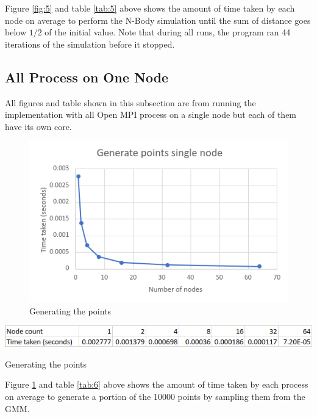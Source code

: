 \documentclass{article}
\begin{document}
Figure \ref{fig:5} and table \ref{tab:5} above shows the amount of time taken by each node on
average to perform the N-Body simulation until the sum of distance goes below \(1/2\) of the initial
value. Note that during all runs, the program ran 44 iterations of the simulation before it stopped.

\clearpage
\subsection*{All Process on One Node}
All figures and table shown in this subsection are from running the implementation with all Open MPI
process on a single node but each of them have its own core.

\begin{figure}[!htb]
\includegraphics[width=\textwidth]{single-node/generate-points.png}
\caption{Generating the points}
\label{fig:6}
\end{figure}
\begin{table}[!htb]
\includegraphics[width=\textwidth]{single-node/generate-points-table.png}
\caption{Generating the points}
\label{tab:6}
\end{table}

Figure \ref{fig:6} and table \ref{tab:6} above shows the amount of time taken by each process on
average to generate a portion of the 10000 points by sampling them from the GMM.
\end{document}
